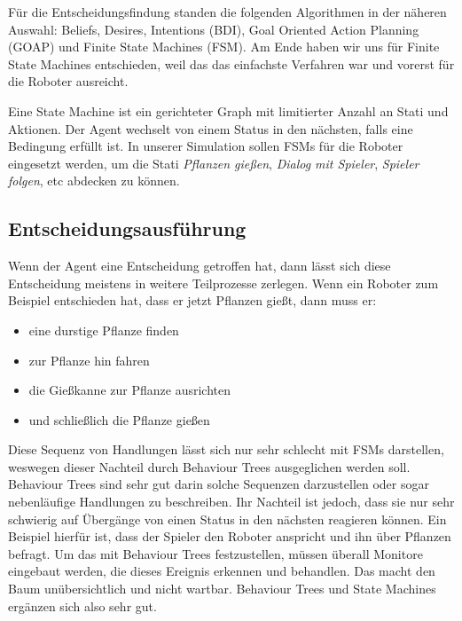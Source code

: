 Für die Entscheidungsfindung standen die folgenden Algorithmen in der näheren Auswahl: Beliefs, Desires, Intentions (BDI), Goal Oriented Action Planning (GOAP) und Finite State Machines (FSM). Am Ende haben wir uns für Finite State Machines entschieden, weil das das einfachste Verfahren war und vorerst für die Roboter ausreicht.

Eine State Machine ist ein gerichteter Graph mit limitierter Anzahl an Stati und Aktionen. Der Agent wechselt von einem Status in den nächsten, falls eine Bedingung erfüllt ist. In unserer Simulation sollen FSMs für die Roboter eingesetzt werden, um die Stati \textit{Pflanzen gießen}, \textit{Dialog mit Spieler}, \textit{Spieler folgen}, etc abdecken zu können. 

\subsection{Entscheidungsausführung}

Wenn der Agent eine Entscheidung getroffen hat, dann lässt sich diese Entscheidung meistens in weitere Teilprozesse zerlegen. Wenn ein Roboter zum Beispiel entschieden hat, dass er jetzt Pflanzen gießt, dann muss er:

\begin{itemize}
\item eine durstige Pflanze finden
\item zur Pflanze hin fahren
\item die Gießkanne zur Pflanze ausrichten
\item und schließlich die Pflanze gießen
\end{itemize}

Diese Sequenz von Handlungen lässt sich nur sehr schlecht mit FSMs darstellen, weswegen dieser Nachteil durch Behaviour Trees ausgeglichen werden soll. Behaviour Trees sind sehr gut darin solche Sequenzen darzustellen oder sogar nebenläufige Handlungen zu beschreiben. Ihr Nachteil ist jedoch, dass sie nur sehr schwierig auf Übergänge von einen Status in den nächsten reagieren können. Ein Beispiel hierfür ist, dass der Spieler den Roboter anspricht und ihn über Pflanzen befragt. Um das mit Behaviour Trees festzustellen, müssen überall Monitore eingebaut werden, die dieses Ereignis erkennen und behandlen. Das macht den Baum unübersichtlich und nicht wartbar. Behaviour Trees und State Machines ergänzen sich also sehr gut.

